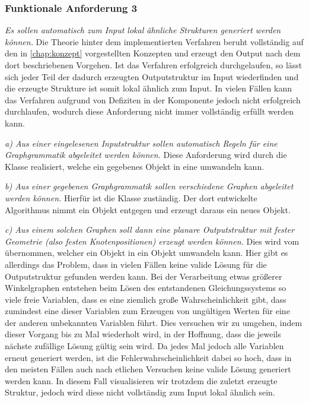 \subsubsection{Funktionale Anforderung 3}
\textit{Es sollen automatisch zum Input lokal ähnliche Strukturen generiert werden können.} Die Theorie hinter dem implementierten Verfahren beruht
vollständig auf den in \autoref{chap:konzept} vorgestellten Konzepten und erzeugt den Output nach dem dort beschriebenen Vorgehen. Ist das Verfahren
erfolgreich durchgelaufen, so lässt sich jeder Teil der dadurch erzeugten Outputstruktur im Input wiederfinden und die erzeugte Strukture ist somit
lokal ähnlich zum Input. In vielen Fällen kann das Verfahren aufgrund von Defiziten in der  Komponente jedoch nicht erfolgreich durchlaufen,
wodurch diese Anforderung nicht immer vollständig erfüllt werden kann.

\textit{a) Aus einer eingelesenen Inputstruktur sollen automatisch Regeln für eine Graphgrammatik abgeleitet werden können.} Diese Anforderung wird
durch die Klasse  realisiert, welche ein gegebenes  Objekt in eine  umwandeln kann.

\textit{b) Aus einer gegebenen Graphgrammatik sollen verschiedene Graphen abgeleitet werden können.} Hierfür ist die  Klasse zuständig.
Der dort entwickelte Algorithmus nimmt ein  Objekt entgegen und erzeugt daraus ein neues  Objekt.

\textit{c) Aus einem solchen Graphen soll dann eine planare Outputstruktur mit fester Geometrie (also festen Knotenpositionen) erzeugt werden können.}
Dies wird vom  übernommen, welcher ein  Objekt in ein  Objekt umwandeln kann. Hier gibt es allerdings
das Problem, dass in vielen Fällen keine valide Lösung für die Outputstruktur gefunden werden kann. Bei der Verarbeitung etwas größerer Winkelgraphen
entstehen beim Lösen des entstandenen Gleichungssystems so viele freie Variablen, dass es eine ziemlich große Wahrscheinlichkeit gibt, dass zumindest
eine dieser Variablen zum Erzeugen von ungültigen Werten für eine der anderen unbekannten Variablen führt. Dies versuchen wir zu umgehen, indem
dieser Vorgang bis zu  Mal wiederholt wird, in der Hoffnung, dass die jeweils nächste zufällige Lösung gültig sein wird. Da jedes Mal
jedoch alle Variablen erneut generiert werden, ist die Fehlerwahrscheinlichkeit dabei so hoch, dass in den meisten Fällen auch nach etlichen Versuchen
keine valide Lösung generiert werden kann. In diesem Fall visualisieren wir trotzdem die zuletzt erzeugte Struktur, jedoch wird diese nicht vollständig
zum Input lokal ähnlich sein.

